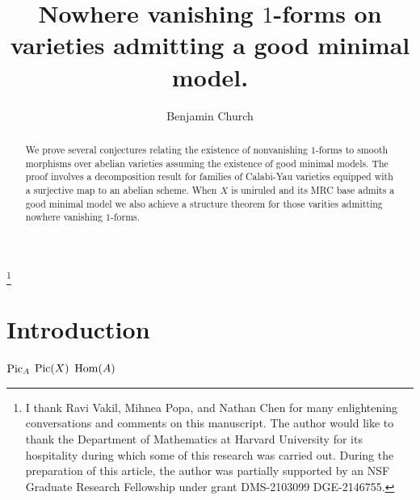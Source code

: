 \documentclass[12pt]{article}
\begin{document}
\thanks{I thank Ravi Vakil, Mihnea Popa, and Nathan Chen for many enlightening conversations and comments on this manuscript. The author would like to thank the Department of Mathematics at Harvard University for its hospitality during which some of this research was carried out. During the preparation of this article, the author was partially supported by an NSF Graduate Research Fellowship under grant DMS-2103099 DGE-2146755.}


\title{Nowhere vanishing $1$-forms on varieties admitting a good minimal model.}
\author{Benjamin Church}


\begin{abstract}
We prove several conjectures relating the existence of nonvanishing $1$-forms to smooth morphisms over abelian varieties assuming the existence of good minimal models. The proof involves a decomposition result for families of Calabi-Yau varieties equipped with a surjective map to an abelian scheme. When $X$ is uniruled and its MRC base admits a good minimal model we also achieve a structure theorem for those varities admitting nowhere vanishing $1$-forms.
\end{abstract}

\maketitle
\tableofcontents

\section{Introduction}

$\operatorname{Pic}_A$ \Kollar $\operatorname{Pic}(X)$ $\operatorname{Hom} (A)$
\end{document}
